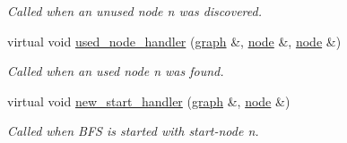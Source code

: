 \begin{DoxyCompactItemize}
\begin{DoxyCompactList}\small\item\em Called when an unused node {\itshape n} was discovered. \end{DoxyCompactList}\item 
virtual void \mbox{\hyperlink{classbfs_a5514649937b2e27f0bfc41ba868cb156}{used\+\_\+node\+\_\+handler}} (\mbox{\hyperlink{classgraph}{graph}} \&, \mbox{\hyperlink{classnode}{node}} \&, \mbox{\hyperlink{classnode}{node}} \&)
\begin{DoxyCompactList}\small\item\em Called when an used node {\itshape n} was found. \end{DoxyCompactList}\item 
virtual void \mbox{\hyperlink{classbfs_ab89a3d1cb36b20a86837b0345063e4b1}{new\+\_\+start\+\_\+handler}} (\mbox{\hyperlink{classgraph}{graph}} \&, \mbox{\hyperlink{classnode}{node}} \&)
\begin{DoxyCompactList}\small\item\em Called when B\+FS is started with start-\/node {\itshape n}. \end{DoxyCompactList}\end{DoxyCompactItemize}
